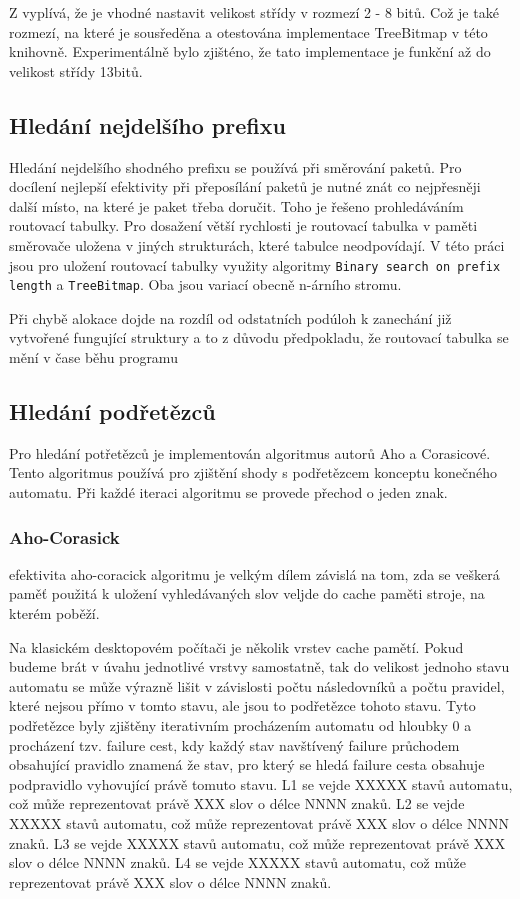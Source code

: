 Z \cite{tbm} vyplívá, že je vhodné nastavit velikost střídy v rozmezí 2 - 8 bitů. Což je také rozmezí,
na které je sousředěna a otestována implementace TreeBitmap v této knihovně. Experimentálně bylo zjišténo,
že tato implementace je funkční až do velikost střídy 13bitů.

\subsection{Hledání nejdelšího prefixu}
Hledání nejdelšího shodného prefixu se používá při směrování paketů.
Pro docílení nejlepší efektivity při přeposílání paketů je nutné znát co nejpřesněji další místo, na které je paket třeba doručit.
Toho je řešeno prohledáváním routovací tabulky.
Pro dosažení větší rychlosti je routovací tabulka v paměti směrovače uložena v jiných strukturách, které tabulce neodpovídají.
V této práci jsou pro uložení routovací tabulky využity algoritmy {\tt Binary search on prefix length} a {\tt TreeBitmap}.
Oba jsou variací obecně n-árního stromu.

Při chybě alokace dojde na rozdíl od odstatních podúloh k zanechání již vytvořené fungující struktury
a to z důvodu předpokladu, že routovací tabulka se mění v čase běhu programu

\subsection{Hledání podřetězců}
Pro hledání potřetězců je implementován algoritmus autorů Aho a Corasicové. Tento algoritmus používá pro zjištění shody s podřetězcem konceptu konečného automatu. Při každé iteraci algoritmu se provede přechod o jeden znak.

\subsubsection{Aho-Corasick}
efektivita aho-coracick algoritmu je velkým dílem závislá na tom, zda se veškerá paměť použitá k uložení vyhledávaných slov veljde do cache paměti stroje, na kterém poběží.

Na klasickém desktopovém počítači je několik vrstev cache pamětí.
Pokud budeme brát v úvahu jednotlivé vrstvy samostatně, tak do
velikost jednoho stavu automatu se může výrazně lišit v závislosti počtu následovníků a počtu
pravidel, které nejsou přímo v tomto stavu, ale jsou to podřetězce tohoto stavu.
Tyto podřetězce byly zjištěny iterativním procházením automatu od hloubky 0 a procházení tzv. failure cest, kdy každý stav navštívený failure průchodem obsahující pravidlo znamená že stav, pro který se hledá failure cesta obsahuje podpravidlo vyhovující právě tomuto stavu.
L1 se vejde XXXXX stavů automatu, což může reprezentovat právě XXX slov o délce NNNN znaků.
L2 se vejde XXXXX stavů automatu, což může reprezentovat právě XXX slov o délce NNNN znaků.
L3 se vejde XXXXX stavů automatu, což může reprezentovat právě XXX slov o délce NNNN znaků.
L4 se vejde XXXXX stavů automatu, což může reprezentovat právě XXX slov o délce NNNN znaků.

